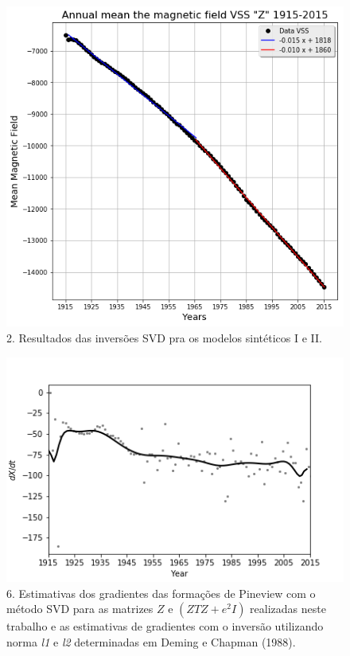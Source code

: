 \documentclass[final,t]{beamer}
\begin{document}
\begin{columns}[t]
\begin{column}{.31\linewidth}
\begin{block}{}
\begin{figure}
	\centering
	\includegraphics[width=0.6\linewidth]{retasZ}
	\caption{2. Resultados das inversões SVD pra os modelos sintéticos I e II.}
	\label{fig:g_Sintetico}
\end{figure}

	\begin{figure}
		\centering
		\includegraphics[width=0.7\linewidth]{spline101sv_X_spline}
		\caption{6. Estimativas dos gradientes das formações de Pineview com o método SVD para as matrizes $Z$ e $(Z{T}Z+e^{2}I)$ realizadas neste trabalho e as estimativas de gradientes com o inversão utilizando norma \textit{l1} e \textit{l2} determinadas em Deming e Chapman (1988).}
		\label{fig:g_Simposio_z1}
	\end{figure}


\end{block}
\end{column}
\end{columns}
\end{document}
